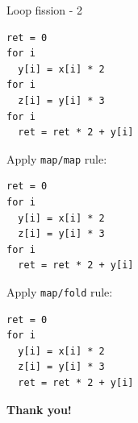 \documentclass[handout]{beamer}
\begin{document}
\begin{frame}[fragile]{Loop fission - 2}

\begin{lstlisting}
ret = 0
for i
  y[i] = x[i] * 2
for i
  z[i] = y[i] * 3
for i
  ret = ret * 2 + y[i]
\end{lstlisting}

Apply {\tt map/map} rule:

\begin{lstlisting}
ret = 0
for i
  y[i] = x[i] * 2
  z[i] = y[i] * 3
for i
  ret = ret * 2 + y[i]
\end{lstlisting}

Apply {\tt map/fold} rule:

\begin{lstlisting}
ret = 0
for i
  y[i] = x[i] * 2
  z[i] = y[i] * 3
  ret = ret * 2 + y[i]
\end{lstlisting}

\end{frame}

\begin{frame}
\centerline{\Huge\bf Thank you!}
\end{frame}
\end{document}

